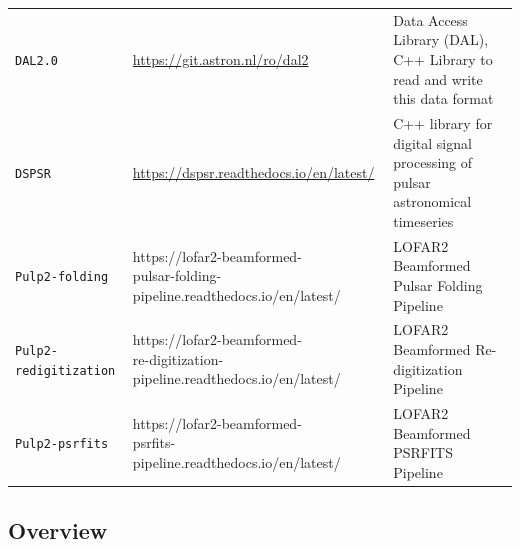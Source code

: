 \documentclass[a4paper,10pt,bibtotoc]{scrartcl}
\begin{document}
\begin{center}
  \tablelasttail{\hline}
  \begin{supertabular}{lp{4.8cm}p{6cm}}
    \shrinkheight{-4.5em}
    \texttt{DAL2.0} & \url{https://git.astron.nl/ro/dal2} & Data Access Library (DAL), C++ Library to read and write this data format \\
    \texttt{DSPSR} & \url{https://dspsr.readthedocs.io/en/latest/} & C++ library for digital signal processing of pulsar astronomical timeseries \\
    \texttt{Pulp2-folding} & \url{https://lofar2-beamformed-\\ pulsar-folding-pipeline.readthedocs.io/en/latest/} & LOFAR2 Beamformed Pulsar Folding Pipeline \\
    \texttt{Pulp2-redigitization} & \url{https://lofar2-beamformed-\\ re-digitization-pipeline.readthedocs.io/en/latest/} & LOFAR2 Beamformed Re-digitization Pipeline \\
    \texttt{Pulp2-psrfits} & \url{https://lofar2-beamformed-\\ psrfits-pipeline.readthedocs.io/en/latest/} & LOFAR2 Beamformed PSRFITS Pipeline \\
    \hline
  \end{supertabular}
\end{center}

\subsection{Overview}
\label{sec:overview}
\end{document}
